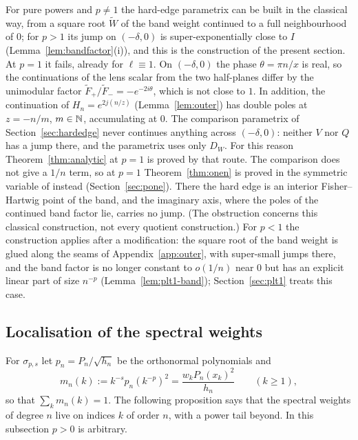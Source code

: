 \begin{remark}[The classical hard-edge parametrix at $p=1$]\label{rem:quotient-p1}
For pure powers and $p\ne1$ the hard-edge parametrix can be built in the classical way, from a square root $\tilde W$ of
the band weight continued to a full neighbourhood of $0$; for $p>1$ its jump on $(-\delta,0)$ is super-exponentially
close to $I$ (Lemma~\ref{lem:bandfactor}(i)), and this is the construction of the present section. At $p=1$ it fails,
already for $\ell\equiv1$. On $(-\delta,0)$ the phase $\theta=\pi n/x$ is real, so the continuations of the lens scalar from
the two half-planes differ by the unimodular factor $\tilde F_+/\tilde F_-=-e^{-2i\theta}$, which is not close to $1$.
In addition, the continuation of $H_n=e^{2j(n/z)}$ (Lemma~\ref{lem:outer}) has double poles at $z=-n/m$, $m\in\mathbb{N}$,
accumulating at $0$. The comparison parametrix of Section~\ref{sec:hardedge} never continues anything across
$(-\delta,0)$: neither $V$ nor $Q$ has a jump there, and the parametrix uses only $D_W$. For this reason
Theorem~\ref{thm:analytic} at $p=1$ is proved by that route. The comparison does not give a $1/n$ term, so at $p=1$
Theorem~\ref{thm:onen} is proved in the symmetric variable of \cite{WLXZ} instead (Section~\ref{sec:pone}). There the
hard edge is an interior Fisher--Hartwig point of the band, and the imaginary axis, where the poles of the continued band
factor lie, carries no jump. (The obstruction concerns this classical construction, not every quotient
construction.) For $p<1$ the construction applies after a modification: the square root of the band weight is glued
along the seams of Appendix~\ref{app:outer}, with super-small jumps there, and the band factor is no longer constant to
$o(1/n)$ near $0$ but has an explicit linear part of size $n^{-p}$ (Lemma~\ref{lem:plt1-band}); Section~\ref{sec:plt1}
treats this case.
\end{remark}

\subsection{Localisation of the spectral weights}\label{sec:tail}

For $\sigma_{p,s}$ let $p_n=P_n/\sqrt{h_n}$ be the orthonormal polynomials and
\[
  m_n(k):=k^{-s}p_n(k^{-p})^2=\frac{w_kP_n(x_k)^2}{h_n}\qquad(k\ge1),
\]
so that $\sum_km_n(k)=1$. The following proposition says that the spectral weights of degree $n$ live on indices $k$ of
order $n$, with a power tail beyond. In this subsection $p>0$ is arbitrary.

